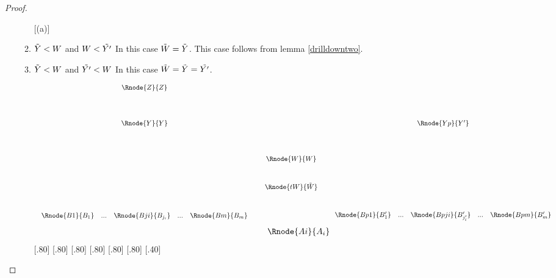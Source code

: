 \documentclass[10pt,a4paper]{scrartcl}
\begin{document}
\begin{proof}
\begin{enumerate}[(i)]
\begin{enumerate} [(a)]
\item  $\tilde{Y} < W $ and $W < \tilde{Y'}$
In this case $\tilde{W} = \tilde{Y}$.
This case follows from lemma \ref{drilldowntwo}.

\item  $\tilde{Y} < W $ and $\tilde{Y'} < W$
In this case $\tilde{W} = \tilde{Y} =\tilde{Y'}$.
\begin{center}
\begin{displaymath}
\begin{array}{c c c c c}
  \Rnode{Z}{Z} & &              & &                   \\ [1.4cm]
  \Rnode{Y}{Y} & &              & &  \Rnode{Yp}{Y'}    \\ [1.4cm]
	             & & \Rnode{W}{W} & &                    \\ [1.0cm]
               & & \Rnode{tW}{\pbase{W}} & &                    \\ [1.0cm]
	 \begin{array}{cp{0.3cm}c         p{0.3cm}  c}					
   \Rnode{B1}{B_1}&  ... & \Rnode{Bji}{B_{j_i}} & ... & \Rnode{Bm}{B_m}
	 \end{array} 
	 & & & &
	\begin{array}{c c c c c}					
   \Rnode{Bp1}{B'_1}& ... & \Rnode{Bpji}{B'_{j'_i}}&  ... & \Rnode{Bpm}{B'_m}
	 \end{array}                                                
\end{array} 
\end{displaymath}
\vspace{1.0cm}
\begin{displaymath}
\begin{array}{c c c c c}
 & &               &  & \Rnode{Ai}{A_i}    \\
\end{array}
\end{displaymath}
[.80]
[.80]
[.80]
[.80]
[.80]
[.80]
[.40]
\end{center}

\end{enumerate}

\end{enumerate}
\end{proof}
\end{document}
